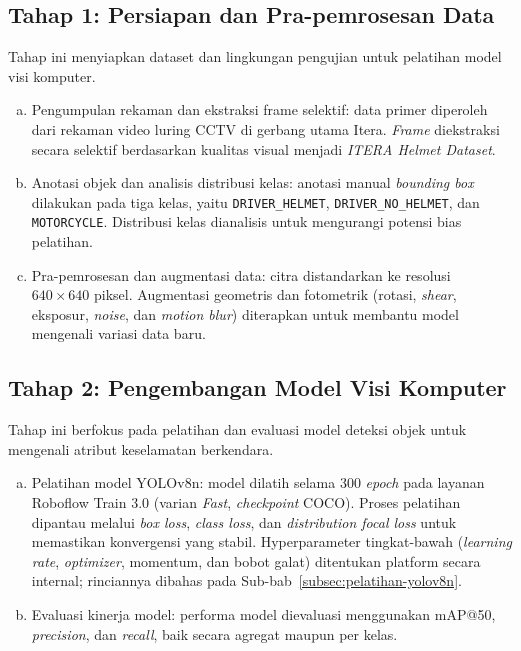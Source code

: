 \subsection{Tahap 1: Persiapan dan Pra-pemrosesan Data}
Tahap ini menyiapkan dataset dan lingkungan pengujian untuk pelatihan model visi komputer.
\begin{enumerate}[a.]
\item {Pengumpulan rekaman dan ekstraksi frame selektif}: data primer diperoleh dari rekaman video luring CCTV di gerbang utama Itera. \textit{Frame} diekstraksi secara selektif berdasarkan kualitas visual menjadi \textit{ITERA Helmet Dataset}.
\item {Anotasi objek dan analisis distribusi kelas}: anotasi manual \textit{bounding box} dilakukan pada tiga kelas, yaitu \texttt{DRIVER\_HELMET}, \texttt{DRIVER\_NO\_HELMET}, dan \texttt{MOTORCYCLE}. Distribusi kelas dianalisis untuk mengurangi potensi bias pelatihan.
\item {Pra-pemrosesan dan augmentasi data}: citra distandarkan ke resolusi $640 \times 640$ piksel. Augmentasi geometris dan fotometrik (rotasi, \textit{shear}, eksposur, \textit{noise}, dan \textit{motion blur}) diterapkan untuk membantu model mengenali variasi data baru.
\end{enumerate}

\subsection{Tahap 2: Pengembangan Model Visi Komputer}
Tahap ini berfokus pada pelatihan dan evaluasi model deteksi objek untuk mengenali atribut keselamatan berkendara.
\begin{enumerate}[a.]
\item {Pelatihan model YOLOv8n}: model dilatih selama 300 \textit{epoch} pada layanan Roboflow Train 3.0 (varian \textit{Fast}, \textit{checkpoint} COCO). Proses pelatihan dipantau melalui \textit{box loss}, \textit{class loss}, dan \textit{distribution focal loss} untuk memastikan konvergensi yang stabil. Hyperparameter tingkat-bawah (\textit{learning rate}, \textit{optimizer}, momentum, dan bobot galat) ditentukan platform secara internal; rinciannya dibahas pada Sub-bab~\ref{subsec:pelatihan-yolov8n}.
\item {Evaluasi kinerja model}: performa model dievaluasi menggunakan mAP@50, \textit{precision}, dan \textit{recall}, baik secara agregat maupun per kelas.
\end{enumerate}

